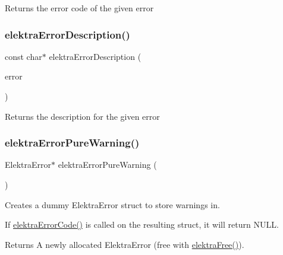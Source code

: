 \begin{DoxyReturn}{Returns}
the error code of the given error 
\end{DoxyReturn}
\mbox{\label{group__highlevel_ga781cda83af3981a55321e7c613afbef0}} 
\subsubsection{\texorpdfstring{elektra\+Error\+Description()}{elektraErrorDescription()}}
{\footnotesize\ttfamily const char$\ast$ elektra\+Error\+Description (\begin{DoxyParamCaption}\item[{const Elektra\+Error $\ast$}]{error }\end{DoxyParamCaption})}

\begin{DoxyReturn}{Returns}
the description for the given error 
\end{DoxyReturn}
\mbox{\label{group__highlevel_ga4895fb4c40822a11219846b189395db0}} 
\subsubsection{\texorpdfstring{elektra\+Error\+Pure\+Warning()}{elektraErrorPureWarning()}}
{\footnotesize\ttfamily Elektra\+Error$\ast$ elektra\+Error\+Pure\+Warning (\begin{DoxyParamCaption}\item[{void}]{ }\end{DoxyParamCaption})}



Creates a dummy Elektra\+Error struct to store warnings in. 

If \hyperlink{group__highlevel_ga22c0775760a9f42f29337c06bf8b2ab5}{elektra\+Error\+Code()} is called on the resulting struct, it will return N\+U\+LL.

\begin{DoxyReturn}{Returns}
A newly allocated Elektra\+Error (free with \hyperlink{internal_8c_a7f572149d2e0bfe18023a6ac969f195c}{elektra\+Free()}). 
\end{DoxyReturn}
\mbox{\label{group__highlevel_ga57d87ff6defe4db402b772ab2a0025f9}} 
